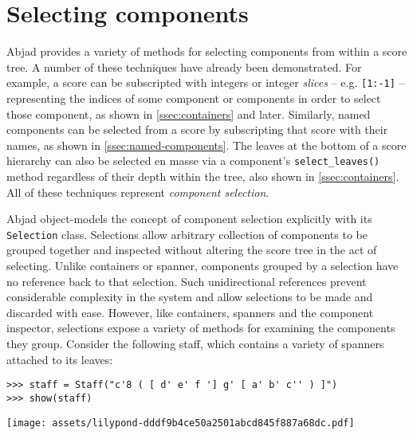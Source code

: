 \section{Selecting components}
\label{sec:selecting-components}

Abjad provides a variety of methods for selecting components from within a
score tree. A number of these techniques have already been demonstrated. For
example, a score can be subscripted with integers or integer \emph{slices} --
e.g. \texttt{[1:-1]} -- representing the indices of some component or
components in order to select those component, as shown in
\autoref{ssec:containers} and later. Similarly, named components can be
selected from a score by subscripting that score with their names, as shown in
\autoref{ssec:named-components}. The leaves at the bottom of a score hierarchy
can also be selected en masse via a component's \texttt{select\_leaves()}
method regardless of their depth within the tree, also shown in
\autoref{ssec:containers}. All of these techniques represent \emph{component
selection}.

Abjad object-models the concept of component selection explicitly with its
\texttt{Selection} class. Selections allow arbitrary collection of components
to be grouped together and inspected without altering the score tree in the act
of selecting. Unlike containers or spanner, components grouped by a selection
have no reference back to that selection. Such unidirectional references
prevent considerable complexity in the system and allow selections to be made
and discarded with ease. However, like containers, spanners and the component
inspector, selections expose a variety of methods for examining the components
they group. Consider the following staff, which contains a variety of spanners
attached to its leaves:

\begin{comment}
<abjad>
staff = Staff("c'8 ( [ d' e' f '] g' [ a' b' c'' ) ]")
show(staff)
</abjad>
\end{comment}

\begin{abjadbookoutput}
\begin{singlespacing}
\vspace{-0.5\baselineskip}
\begin{verbatim}
>>> staff = Staff("c'8 ( [ d' e' f '] g' [ a' b' c'' ) ]")
>>> show(staff)
\end{verbatim}
\noindent\texttt{[image: assets/lilypond-dddf9b4ce50a2501abcd845f887a68dc.pdf]}
\end{singlespacing}
\end{abjadbookoutput}

